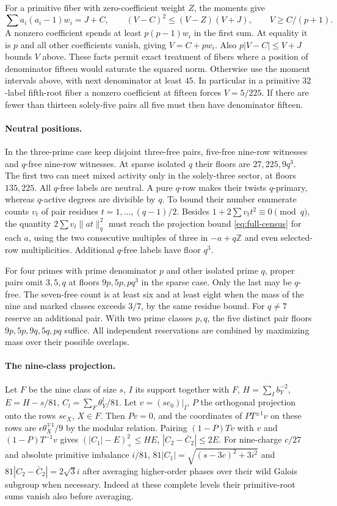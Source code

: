 \documentclass[11pt]{amsart}
\numberwithin{equation}{section}
\theoremstyle{definition}
\theoremstyle{plain}
\newcommand{\ZZ}{\mathbb Z}
\begin{document}
For a primitive fiber with zero-coefficient weight $Z$, the moments
give
\[
 \sum a_i(a_i-1)w_i=J+C,\qquad
 (V-C)^2\le(V-Z)(V+J),\qquad
 V\ge C/(p+1).
\]
A nonzero coefficient spends at least $p(p-1)w_i$ in the first sum.
At equality it is $p$ and all other coefficients vanish, giving
$V=C+pw_i$. Also $p|V-C|\le V+J$ bounds $V$ above. These facts
permit exact treatment of fibers where a position of denominator
fifteen would saturate the squared norm. Otherwise use the moment
intervals above, with next denominator at least $45$. In particular
in a primitive $32$-label fifth-root fiber a nonzero coefficient at
fifteen forces $V=5/225$. If there are fewer than thirteen solely-five
pairs all five must then have denominator fifteen.

\paragraph{Neutral positions.}
In the three-prime case keep disjoint three-free pairs, five-free
nine-row witnesses and $q$-free nine-row witnesses. At sparse isolated
$q$ their floors are $27,225,9q^3$. The first two can meet mixed
activity only in the solely-three sector, at floors $135,225$.
All $q$-free labels are neutral. A pure $q$-row makes their twists
$q$-primary, whereas $q$-active degrees are divisible by $q$.
To bound their number enumerate counts $v_t$ of pair residues
$t=1,\ldots,(q-1)/2$. Besides $1+2\sum v_tt^2\equiv0\pmod q$,
the quantity $2\sum v_t\|at\|_q^2$ must reach the projection bound
\eqref{eq:full-census} for each $a$, using the two consecutive
multiples of three in $-a+q\ZZ$ and even selected-row multiplicities.
Additional $q$-free labels have floor $q^3$.

For four primes with prime denominator $p$ and other isolated prime
$q$, proper pairs omit $3,5,q$ at floors $9p,5p,pq^3$ in the sparse
case. Only the last may be $q$-free. The seven-free count is at least
six and at least eight when the mass of the nine and marked classes
exceeds $3/7$, by the same residue bound. For $q\ne7$ reserve an
additional pair. With two prime classes $p,q$, the five distinct pair
floors $9p,5p,9q,5q,pq$ suffice. All independent reservations are
combined by maximizing mass over their possible overlaps.

\paragraph{The nine-class projection.}
Let $F$ be the nine class of size $s$, $I$ its support together with $F$,
$H=\sum_I b_Y^{-2}$, $E=H-s/81$, $C_l=\sum_F\theta_Y^l/81$.
Let $v=(se_0)|_I$, $P$ the orthogonal projection onto the rows $se_X$,
$X\in F$. Then $Pv=0$, and the coordinates of $PT^{\pm1}v$ on these
rows are $\epsilon\theta_X^{\mp1}/9$ by the modular relation. Pairing
$(1-P)Tv$ with $v$ and $(1-P)T^{-1}v$ gives
$(|C_1|-E)_+^2\le HE$, $|C_2-\bar C_2|\le2E$. For nine-charge $c/27$
and absolute primitive imbalance $i/81$,
$81|C_1|=\sqrt{(s-3c)^2+3i^2}$ and
$81|C_2-\bar C_2|=2\sqrt3 i$ after averaging higher-order phases
over their wild Galois subgroup when necessary. Indeed at these
complete levels their primitive-root sums vanish also before averaging.
\end{document}
